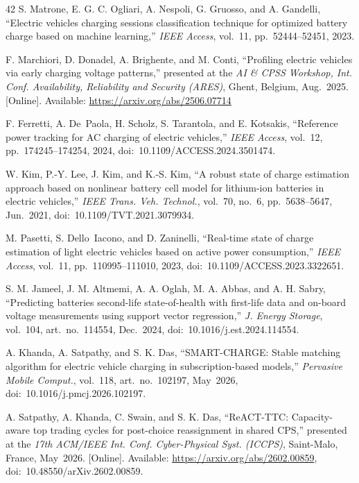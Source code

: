 \documentclass{ieeeaccess}
\newif\ifhighlight \highlightfalse
\DeclareRobustCommand{\revised}[1]{\ifhighlight{\color{blue}#1}\else{\color{.}#1}\fi}
\begin{document}
\begin{thebibliography}{42}
         S. Matrone, E. G. C. Ogliari, A. Nespoli, G. Gruosso, and A. Gandelli, ``Electric vehicles charging sessions classification technique for optimized battery charge based on machine learning,'' \textit{IEEE Access}, vol.~11, pp.~52444--52451, 2023.

         F. Marchiori, D. Donadel, A. Brighente, and M. Conti, ``Profiling electric vehicles via early charging voltage patterns,'' presented at the \textit{AI \& CPSS Workshop, Int. Conf. Availability, Reliability and Security (ARES)}, Ghent, Belgium, Aug.~2025. [Online]. Available: \url{https://arxiv.org/abs/2506.07714}

         F. Ferretti, A. De~Paola, H. Scholz, S. Tarantola, and E. Kotsakis, ``Reference power tracking for AC charging of electric vehicles,'' \textit{IEEE Access}, vol.~12, pp.~174245--174254, 2024, doi:~10.1109/ACCESS.2024.3501474.

         W. Kim, P.-Y. Lee, J. Kim, and K.-S. Kim, ``A robust state of charge estimation approach based on nonlinear battery cell model for lithium-ion batteries in electric vehicles,'' \textit{IEEE Trans. Veh. Technol.}, vol.~70, no.~6, pp.~5638--5647, Jun.~2021, doi:~10.1109/TVT.2021.3079934.

         M. Pasetti, S. Dello~Iacono, and D. Zaninelli, ``Real-time state of charge estimation of light electric vehicles based on active power consumption,'' \textit{IEEE Access}, vol.~11, pp.~110995--111010, 2023, doi:~10.1109/ACCESS.2023.3322651.

         \revised{S. M. Jameel, J. M. Altmemi, A. A. Oglah, M. A. Abbas, and A. H. Sabry, ``Predicting batteries second-life state-of-health with first-life data and on-board voltage measurements using support vector regression,'' \textit{J. Energy Storage}, vol.~104, art.~no.~114554, Dec.~2024, doi:~10.1016/j.est.2024.114554.}

         A. Khanda, A. Satpathy, and S. K. Das, ``SMART-CHARGE: Stable matching algorithm for electric vehicle charging in subscription-based models,'' \textit{Pervasive Mobile Comput.}, vol.~118, art.~no.~102197, May~2026, doi:~10.1016/j.pmcj.2026.102197.

         A. Satpathy, A. Khanda, C. Swain, and S. K. Das, ``ReACT-TTC: Capacity-aware top trading cycles for post-choice reassignment in shared CPS,'' presented at the \textit{17th ACM/IEEE Int. Conf. Cyber-Physical Syst. (ICCPS)}, Saint-Malo, France, May~2026. [Online]. Available: \url{https://arxiv.org/abs/2602.00859}, doi:~10.48550/arXiv.2602.00859.


\end{thebibliography}
\end{document}
